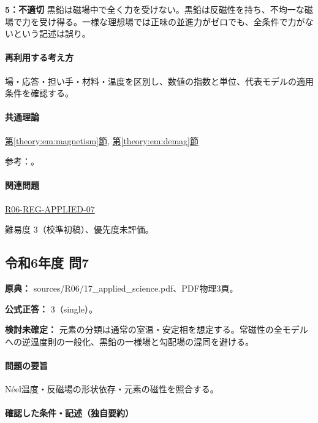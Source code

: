 \noindent\textbf{5：不適切} 黒鉛は磁場中で全く力を受けない。黒鉛は反磁性を持ち、不均一な磁場で力を受け得る。一様な理想場では正味の並進力がゼロでも、全条件で力がないという記述は誤り。\par

\paragraph{再利用する考え方} 場・応答・担い手・材料・温度を区別し、数値の指数と単位、代表モデルの適用条件を確認する。

\paragraph{共通理論} \hyperref[theory:em:magnetism]{第\ref*{theory:em:magnetism}節}, \hyperref[theory:em:demag]{第\ref*{theory:em:demag}節}

\par 参考：\cite{openstax_magnetism,em51_pauli,em51_demag}。

\paragraph{関連問題} \hyperref[q:r06-reg-applied-07]{R06-REG-APPLIED-07}

\par 難易度 3（校準初稿）、優先度未評価。

\subsection{令和6年度 問7}
\label{q:r06-reg-applied-07}

\noindent\textbf{原典：} sources/R06/17\_applied\_science.pdf、PDF物理3頁。

\textbf{公式正答：} 3（single）。

\par\textbf{検討未確定：} 元素の分類は通常の室温・安定相を想定する。常磁性の全モデルへの逆温度則の一般化、黒鉛の一様場と勾配場の混同を避ける。

\paragraph{問題の要旨} Néel温度・反磁場の形状依存・元素の磁性を照合する。

\paragraph{確認した条件・記述（独自要約）}\mbox{}\par

